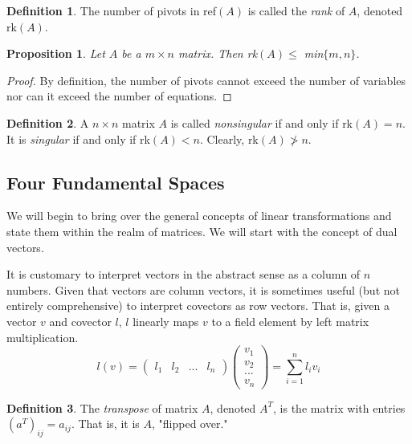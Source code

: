 \documentclass{article}
\newtheorem{proposition}[theorem]{Proposition}
\theoremstyle{remark}
\theoremstyle{definition}
\newtheorem{definition}{Definition}[section]
\begin{document}
    \begin{definition}
    The number of pivots in ref$(A)$ is called the \textit{rank} of $A$, denoted rk$(A)$. 
    \end{definition}

    \begin{proposition}
    Let $A$ be a $m \times n$ matrix. Then rk$(A) \leq$ min$\{m ,n\}$. 
    \end{proposition}
    \begin{proof}
    By definition, the number of pivots cannot exceed the number of variables nor can it exceed the number of equations. 
    \end{proof}

    \begin{definition}
    A $n \times n$ matrix $A$ is called \textit{nonsingular} if and only if rk$(A) = n$. It is \textit{singular} if and only if rk$(A) < n$. Clearly, rk$(A) \not> n$. 
    \end{definition}

  \subsection{Four Fundamental Spaces}

    We will begin to bring over the general concepts of linear transformations and state them within the realm of matrices. We will start with the concept of dual vectors. 

    It is customary to interpret vectors in the abstract sense as a column of $n$ numbers. Given that vectors are column vectors, it is sometimes useful (but not entirely comprehensive) to interpret covectors as row vectors. That is, given a vector $v$ and covector $l$, $l$ linearly maps $v$ to a field element by left matrix multiplication. 
    \[ l(v) = \begin{pmatrix} l_1 & l_2 & ... & l_n \end{pmatrix} \begin{pmatrix}
    v_1 \\ v_2 \\ ... \\ v_n
    \end{pmatrix} = \sum_{i = 1}^{n} l_i v_i\]

    \begin{definition}
    The \textit{transpose} of matrix $A$, denoted $A^T$, is the matrix with entries $(a^T)_{i j} = a_{i j}$. That is, it is $A$, "flipped over." 
    \end{definition}
\end{document}
